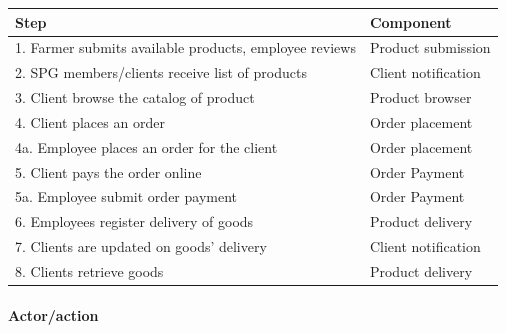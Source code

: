 \begin{table}[h!]
  \renewcommand{\arraystretch}{1.4}
  \centering
  \begin{tabular}{ll}
    \textbf{Step}                                          & \textbf{Component}  \\

    \hline
    1. Farmer submits available products, employee reviews & Product submission  \\
    2. SPG members/clients receive list of products        & Client notification \\
    3. Client browse the catalog of product                & Product browser     \\
    4. Client places an order                              & Order placement     \\
    4a. Employee places an order for the client            & Order placement     \\
    5. Client pays the order online                        & Order Payment       \\
    5a. Employee submit order payment                      & Order Payment       \\
    6. Employees register delivery of goods                & Product delivery    \\
    7. Clients are updated on goods' delivery              & Client notification \\
    8. Clients retrieve goods                              & Product delivery    \\
  \end{tabular}
\end{table}


\newpage
\paragraph{Actor/action}

